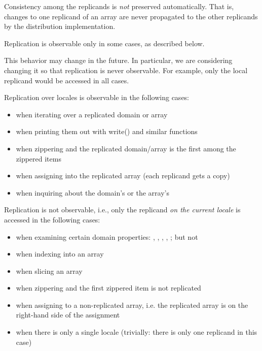 Consistency among the replicands is \emph{not} preserved automatically.
That is, changes to one replicand of an array are never propagated to
the other replicands by the distribution implementation.

Replication is observable only in some cases, as described below.

\begin{future}
This behavior may change in the future. In particular,
we are considering changing it so that replication
is never observable. For example, only the local replicand would
be accessed in all cases.
\end{future}

Replication over locales is observable in the following cases:

\begin{itemize}
\item when iterating over a replicated domain or array
\item when printing them out with write() and similar functions
\item when zippering and the replicated domain/array is
  the first among the zippered items
\item when assigning into the replicated array
  (each replicand gets a copy)
\item when inquiring about the domain's 
  or the array's 
\end{itemize}

Replication is not observable, i.e., only the replicand
\emph{on the current locale} is accessed in the following cases:

\begin{itemize}
\item when examining certain domain properties:
  , , , , ;
  but not 
\item when indexing into an array
\item when slicing an array
\item when zippering and the first zippered item is not replicated
\item when assigning to a non-replicated array,
  i.e. the replicated array is on the right-hand side of the assignment
\item when there is only a single locale
 (trivially: there is only one replicand in this case)
\end{itemize}

